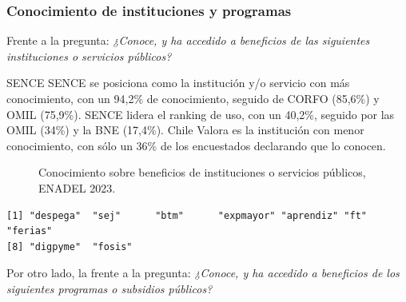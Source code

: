 \documentclass[
  11pt,
]{article}
\begin{document}
\subsubsection{Conocimiento de instituciones y
programas}\label{conocimiento-de-instituciones-y-programas}

Frente a la pregunta: \emph{¿Conoce, y ha accedido a beneficios de las
siguientes instituciones o servicios públicos?}

SENCE SENCE se posiciona como la institución y/o servicio con más
conocimiento, con un 94,2\% de conocimiento, seguido de CORFO (85,6\%) y
OMIL (75,9\%). SENCE lidera el ranking de uso, con un 40,2\%, seguido
por las OMIL (34\%) y la BNE (17,4\%). Chile Valora es la institución
con menor conocimiento, con sólo un 36\% de los encuestados declarando
que lo conocen.

\begin{figure}[H]

\caption{\label{fig-conocimiento_1}Conocimiento sobre beneficios de
instituciones o servicios públicos, ENADEL 2023.}


\end{figure}%

\begin{verbatim}
[1] "despega"  "sej"      "btm"      "expmayor" "aprendiz" "ft"       "ferias"  
[8] "digpyme"  "fosis"   
\end{verbatim}

Por otro lado, la frente a la pregunta: \emph{¿Conoce, y ha accedido a
beneficios de los siguientes programas o subsidios públicos?}
\end{document}
